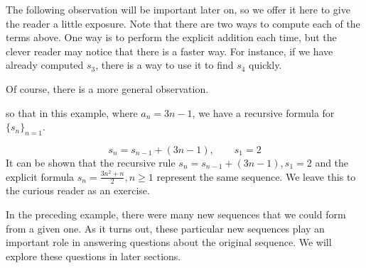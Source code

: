 \documentclass{ximera}
\begin{document}
\begin{remark} 
The following observation will be important later on, so we offer it here to give the reader a little exposure.  Note that there are two ways to compute each of the terms above.  One way is to perform the explicit addition each time, but the clever reader may notice that there is a faster way.  For instance, if we have already computed $s_3$, there is a way to use it to find $s_4$ quickly.


\begin{image}
  \end{image}

Of course, there is a more general observation.

\begin{image}
  \end{image}




so that in this example, where $a_n = 3n-1$, we have a recursive formula for $\{s_n\}_{n=1}$.

\[
s_n = s_{n-1} + (3n-1), \qquad s_1 =2
\]  
It can be shown that the recursive rule $s_n = s_{n-1} + (3n-1), s_1
=2$ and the explicit formula $s_n = \frac{3n^2+n}{2} , n \geq 1$
represent the same sequence.  We leave this to the curious reader as
an exercise.    
\end{remark}

In the preceding example, there were many new sequences that we could form from a given one.  As it turns out, these particular new sequences play an important role in answering questions about the original sequence.  We will explore these questions in later sections.
\end{document}
